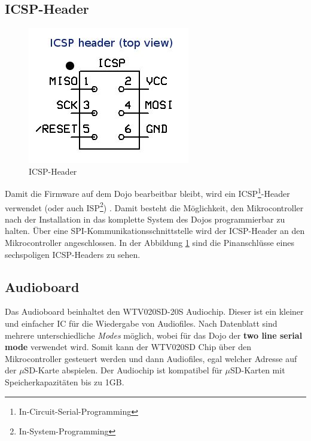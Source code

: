 \subsection{ICSP-Header}
\begin{figure}
	\vspace{-40pt}
  	\begin{center}
		\includegraphics[scale=0.6]{Bilder/icsp_header.png}
  	\end{center}
 	\vspace{-20pt}	
	\caption{ICSP-Header}
  	\vspace{-2cm}
	\label{fig:icsp_header_topview}
\end{figure}
Damit die Firmware auf dem Dojo bearbeitbar bleibt, wird ein ICSP\footnote{In-Circuit-Serial-Programming}-Header verwendet (oder auch ISP\footnote{In-System-Programming}) \cite{ispwiki}. Damit besteht die Möglichkeit, den Mikrocontroller nach der Installation in das komplette System des Dojos programmierbar zu halten. Über eine SPI-Kommunikationsschnittstelle wird der ICSP-Header an den Mikrocontroller angeschlossen. In der Abbildung \ref{fig:icsp_header_topview} sind die Pinanschlüsse eines sechspoligen ICSP-Headers zu sehen.\\
\vspace{1cm}
\subsection{Audioboard}
Das Audioboard beinhaltet den WTV020SD-20S Audiochip. Dieser ist ein kleiner und einfacher IC für die Wiedergabe von Audiofiles. Nach Datenblatt sind mehrere unterschiedliche \textit{Modes} möglich, wobei für das Dojo der \textbf{two line serial mode} verwendet wird. Somit kann der WTV020SD Chip über den Mikrocontroller gesteuert werden und dann Audiofiles, egal welcher Adresse auf der $\mu$SD-Karte abspielen. Der Audiochip ist kompatibel für $\mu$SD-Karten mit Speicherkapazitäten bis zu 1GB. 
